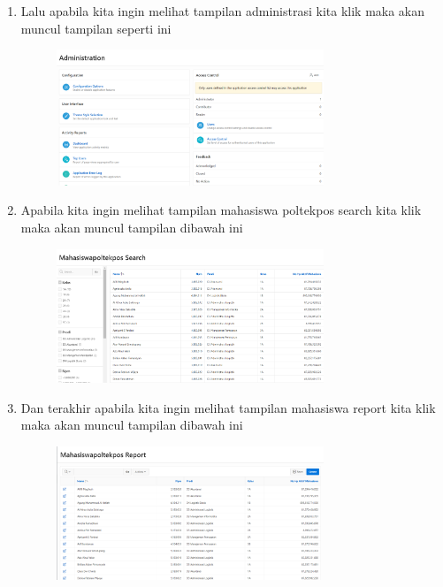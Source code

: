 \documentclass{article}
\begin{document}
\begin{enumerate}
\begin{figure}[h]
    \end{figure}
    \item Lalu apabila kita ingin melihat tampilan administrasi kita klik maka akan muncul tampilan seperti ini
    \begin{figure}[h]
    \centerline{\includegraphics[width=8cm]{image/administrasi.PNG}}
    \end{figure}
    \newpage \item Apabila kita ingin melihat tampilan mahasiswa poltekpos search kita klik maka akan muncul tampilan dibawah ini
    \begin{figure}[h]
    \centerline{\includegraphics[width=8cm]{image/mahasiswapoltekpos.PNG}}
    \end{figure}
    \item Dan terakhir apabila kita ingin melihat tampilan mahasiswa report kita klik maka akan muncul tampilan dibawah ini
    \begin{figure}[h]
    \centerline{\includegraphics[width=8cm]{image/mahasiswareport.PNG}}
    \end{figure}
\end{enumerate}
\end{document}
